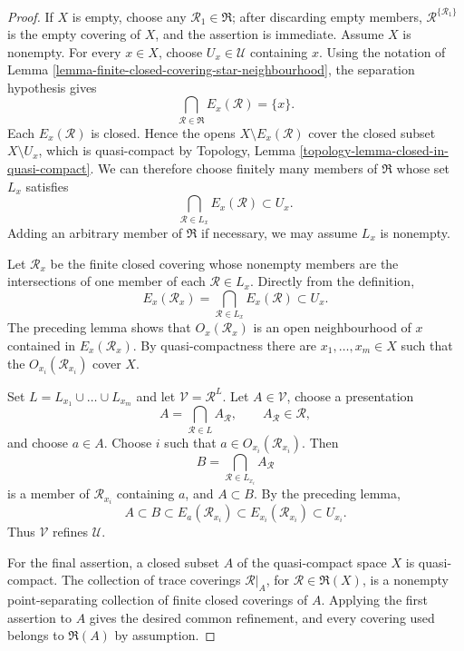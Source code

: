 \begin{proof}
If $X$ is empty, choose any $\mathcal R_1 \in \mathfrak R$; after discarding
empty members, $\mathcal R^{\{\mathcal R_1\}}$ is the empty covering of
$X$, and the assertion is immediate. Assume $X$ is nonempty. For every
$x \in X$, choose
$U_x \in \mathcal U$ containing $x$. Using the notation of
Lemma \ref{lemma-finite-closed-covering-star-neighbourhood}, the separation
hypothesis gives
$$
\bigcap_{\mathcal R \in \mathfrak R} E_x(\mathcal R) = \{x\}.
$$
Each $E_x(\mathcal R)$ is closed. Hence the opens
$X \setminus E_x(\mathcal R)$ cover the closed subset
$X \setminus U_x$, which is quasi-compact by Topology, Lemma
\ref{topology-lemma-closed-in-quasi-compact}. We can therefore choose
finitely many members of $\mathfrak R$ whose set $L_x$ satisfies
$$
\bigcap_{\mathcal R \in L_x} E_x(\mathcal R) \subset U_x.
$$
Adding an arbitrary member of $\mathfrak R$ if necessary, we may assume
$L_x$ is nonempty.

Let $\mathcal R_x$ be the finite closed covering whose nonempty members are
the intersections of one member of each $\mathcal R \in L_x$. Directly
from the definition,
$$
E_x(\mathcal R_x) =
\bigcap_{\mathcal R \in L_x} E_x(\mathcal R) \subset U_x.
$$
The preceding lemma shows that $O_x(\mathcal R_x)$ is an open neighbourhood
of $x$ contained in $E_x(\mathcal R_x)$. By quasi-compactness there are
$x_1, \ldots, x_m \in X$ such that the $O_{x_i}(\mathcal R_{x_i})$ cover
$X$.

Set $L = L_{x_1} \cup \ldots \cup L_{x_m}$ and let
$\mathcal V = \mathcal R^L$. Let $A \in \mathcal V$, choose a presentation
$$
A = \bigcap_{\mathcal R \in L} A_{\mathcal R},
\qquad A_{\mathcal R} \in \mathcal R,
$$
and choose $a \in A$. Choose $i$ such that
$a \in O_{x_i}(\mathcal R_{x_i})$. Then
$$
B = \bigcap_{\mathcal R \in L_{x_i}} A_{\mathcal R}
$$
is a member of $\mathcal R_{x_i}$ containing $a$, and $A \subset B$.
By the preceding lemma,
$$
A \subset B \subset E_a(\mathcal R_{x_i})
\subset E_{x_i}(\mathcal R_{x_i}) \subset U_{x_i}.
$$
Thus $\mathcal V$ refines $\mathcal U$.

For the final assertion, a closed subset $A$ of the quasi-compact space
$X$ is quasi-compact. The collection of trace coverings
$\mathcal R|_A$, for $\mathcal R \in \mathfrak R(X)$, is a nonempty
point-separating collection of finite closed coverings of $A$. Applying
the first assertion to $A$ gives the desired common refinement, and every
covering used belongs to $\mathfrak R(A)$ by assumption.
\end{proof}

